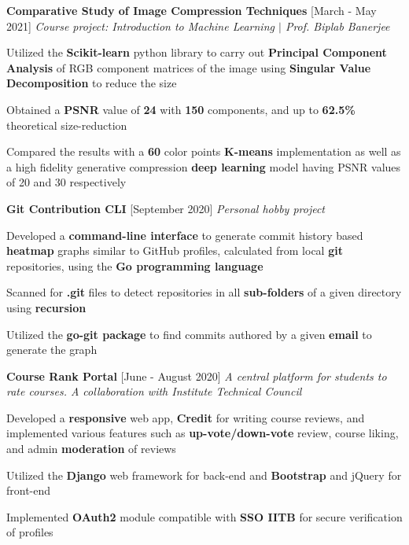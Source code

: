 \documentclass[12pt]{article}
\newcommand{\smallbullet}{
    \small$\bullet$
}
\newcommand{\bigblock}[3]{
    {
        \hspace*{-8pt} \textbf{#1} \hfill #2 \newline
        \textit{#3}
    }
}
\newenvironment{bullet-list-minor}{
    \begin{list}{
        \smallbullet
    }{
        \setlength\leftmargin{30pt}\topsep 0pt \itemsep -3pt
    }
} {
    \end{list}
}
\begin{document}
    \bigblock{
        Comparative Study of Image Compression Techniques
    }{
        [March - May 2021]
    }{
        Course project: Introduction to Machine Learning \(|\) Prof. Biplab Banerjee
    }
	\begin{bullet-list-minor}
        \item Utilized the \textbf{Scikit-learn} python library to carry out \textbf{Principal Component Analysis} of RGB component
        matrices of the image using \textbf{Singular Value Decomposition} to reduce the size
        \item Obtained a \textbf{PSNR} value of \textbf{24} with \textbf{150} components, and up to \textbf{62.5\%} theoretical size-reduction
        \item Compared the results with a \textbf{60} color points \textbf{K-means} implementation as well as a high fidelity generative
        compression \textbf{deep learning} model having PSNR values of 20 and 30 respectively
    \end{bullet-list-minor}

    \bigblock{
        Git Contribution CLI
    }{
        [September 2020]
    }{
        Personal hobby project
    }
	\begin{bullet-list-minor}
        \item Developed a \textbf{command-line interface} to generate commit history based \textbf{heatmap} graphs
        similar to GitHub profiles, calculated from local \textbf{git} repositories, using the \textbf{Go programming
        language}
        \item Scanned for \textbf{.git} files to detect repositories in all \textbf{sub-folders} of a given directory
        using \textbf{recursion}
        \item Utilized the \textbf{go-git package} to find commits authored by a given \textbf{email} to generate the
        graph
    \end{bullet-list-minor}

    \bigblock{
        Course Rank Portal
    }{
        [June - August 2020]
    }{
        A central platform for students to rate courses. A collaboration with Institute Technical Council
    }
	\begin{bullet-list-minor}
        \item Developed a \textbf{responsive} web app, \textbf{Credit} for writing course reviews, and implemented
        various features such as \textbf{up-vote/down-vote} review, course liking, and admin \textbf{moderation}
        of reviews
        \item Utilized the \textbf{Django} web framework for back-end and \textbf{Bootstrap} and jQuery for front-end
        \item Implemented \textbf{OAuth2} module compatible with \textbf{SSO IITB} for secure verification of profiles
    \end{bullet-list-minor}
\end{document}
